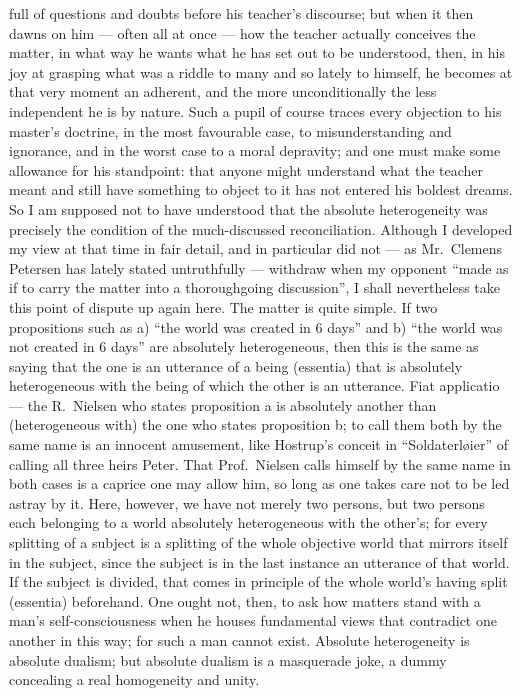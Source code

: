 \documentclass[12pt,a4paper]{book}
\newcommand{\opage}[1]{\marginnote{\footnotesize\textit{[#1]}}}
\begin{document}
full of questions and doubts before his teacher's discourse; but when it then
dawns on him --- often all at once --- how the teacher actually conceives the
matter, in what way he wants what he has set out to be understood, then, in his
joy at grasping what was a riddle to many and so lately to himself, he becomes
at that very moment an adherent, and the more unconditionally the less
independent he is by nature. Such a pupil of course traces every objection to
his master's doctrine, in the most favourable case, to misunderstanding and
ignorance, and in the worst case to a moral depravity; and one must make some
allowance for his standpoint: that anyone might understand what the teacher
meant and still have something to object to it has not entered his boldest
dreams. So I am supposed not to have understood that the absolute heterogeneity
was precisely the condition of the much-discussed reconciliation. Although I
developed my view at that time in fair detail, and in particular did not ---
as Mr.\ Clemens Petersen has lately stated untruthfully --- withdraw when my
opponent ``made as if to carry the matter into a thoroughgoing discussion'', I
shall nevertheless take this point of dispute up again here. The matter is
quite simple. If two propositions such as
\opage{34}a) ``the world was created in 6 days'' and b) ``the world was not
created in 6 days'' are absolutely heterogeneous, then this is the same as
saying that the one is an utterance of a being (essentia) that is absolutely
heterogeneous with the being of which the other is an utterance. Fiat
applicatio --- the R.\ Nielsen who states proposition a is absolutely another
than (heterogeneous with) the one who states proposition b; to call them both
by the same name is an innocent amusement, like Hostrup's conceit in
``Soldaterløier'' of calling all three heirs Peter. That Prof.\ Nielsen calls
himself by the same name in both cases is a caprice one may allow him, so long
as one takes care not to be led astray by it. Here, however, we have not merely
two persons, but two persons each belonging to a world absolutely heterogeneous
with the other's; for every splitting of a subject is a splitting of the whole
objective world that mirrors itself in the subject, since the subject is in the
last instance an utterance of that world. If the subject is divided, that comes
in principle of the whole world's having split (essentia) beforehand. One ought
not, then, to ask how matters stand with a man's self-consciousness when he
houses fundamental views that contradict one another in this way; for such a
man cannot exist. Absolute heterogeneity is absolute dualism; but absolute
dualism is a masquerade joke, a dummy concealing a real homogeneity and unity.
\end{document}
